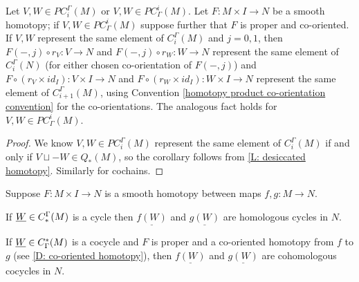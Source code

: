 \begin{corollary}\label{C: chain homotopy}
	Let $V, W \in PC_i^\Gamma(M)$ or $V, W \in PC^i_\Gamma(M)$.
	Let $F \colon M \times I \to N$ be a smooth homotopy; if $V,W \in PC^i_\Gamma(M)$ suppose further that $F$ is proper and co-oriented.
	If $V, W$ represent the same element of $C_i^\Gamma(M)$ and $j = 0, 1$, then $F(-,j) \circ r_V \colon V \to N$ and $F(-,j) \circ r_W \colon W \to N$ represent the same element of $C_i^\Gamma(N)$ (for either chosen co-orientation of $F(-,j)$) and $F \circ (r_V \times id_I) \colon V \times I \to N$ and $F \circ (r_W \times id_I) \colon W \times I \to N$ represent the same element of $C_{i+1}^\Gamma(M)$, using Convention \ref{homotopy product co-orientation convention} for the co-orientations.
	The analogous fact holds for $V, W \in PC^i_\Gamma(M)$.
\end{corollary}

\begin{proof}
	We know $V, W \in PC_i^\Gamma(M)$ represent the same element of $C_i^\Gamma(M)$ if and only if $V \sqcup -W \in Q_*(M)$, so the corollary follows from \cref{L: desiccated homotopy}.
	Similarly for cochains.
\end{proof}

\begin{corollary}\label{C: homotopy}
	Suppose $F \colon M \times I \to N$ is a smooth homotopy between maps $f,g \colon M \to N$.

	If $\underline{W} \in C_*^\Gamma(M)$ is a cycle then $\underline{f(W)}$ and $\underline{g(W)}$ are homologous cycles in $N$.

	If $\underline{W} \in C^*_\Gamma(M)$ is a cocycle and $F$ is proper and a co-oriented homotopy from $f$ to $g$ (see \cref{D: co-oriented homotopy}), then $\underline{f(W)}$ and $\underline{g(W)}$ are cohomologous cocycles in $N$.
\end{corollary}

